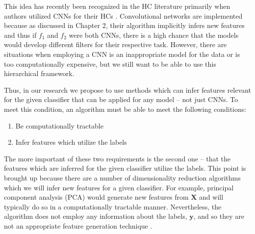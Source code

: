 \documentclass[../thesis.tex]{subfiles}
\begin{document}
This idea has recently been recognized in the HC literature primarily when
authors utilized CNNs for their HCs \cite{yan2015hd} \cite{wang2018learning}.
Convolutional networks are implemented because as discussed in Chapter 2, their
algorithm implicitly infers new features and thus if $f_1$ and $f_2$ were both
CNNs, there is a high chance that the models would develop different filters for
their respective task. However, there are situations when employing a CNN is an
inappropriate model for the data or is too computationally expensive, but we
still want to be able to use this hierarchical framework.

Thus, in our research we propose to use methods which can infer features
relevant for the given classifier that can be applied for any model -- not just
CNNs. To meet this condition, an algorithm must be able to meet the following
conditions:
\begin{enumerate}
    \item Be computationally tractable
    \item Infer features which utilize the labels
\end{enumerate}
The more important of these two requirements is the second one -- that the
features which are inferred for the given classifier utilize the labels. This
point is brought up because there are a number of dimensionality reduction
algorithms which we will infer new features for a given classifier. For example,
principal component analysis (PCA) would generate new features from $\mathbf{X}$
and will typically do so in a computationally tractable manner. Nevertheless,
the algorithm does not employ any information about the labels, $\mathbf{y}$,
and so they are not an appropriate feature generation technique
\cite{jolliffe2011principal}.
\end{document}
